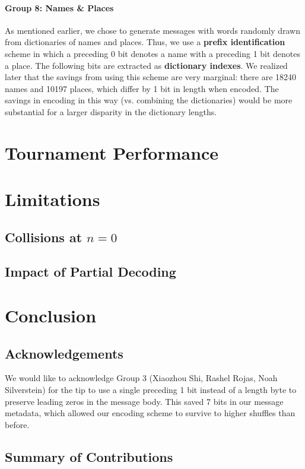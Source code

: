 \documentclass{article}
\begin{document}
\paragraph{Group 8: Names \& Places} As mentioned earlier, we chose to generate messages with words randomly drawn from dictionaries of names and places. Thus, we use a \textbf{prefix identification} scheme in which a preceding 0 bit denotes a name with a preceding 1 bit denotes a place. The following bits are extracted as \textbf{dictionary indexes}. We realized later that the savings from using this scheme are very marginal: there are 18240 names and 10197 places, which differ by 1 bit in length when encoded. The savings in encoding in this way (vs. combining the dictionaries) would be more substantial for a larger disparity in the dictionary lengths.

\section{Tournament Performance}

\section{Limitations}

\subsection{Collisions at $n=0$}

\subsection{Impact of Partial Decoding}

\section{Conclusion}

\subsection{Acknowledgements}
We would like to acknowledge Group 3 (Xiaozhou Shi, Rashel Rojas, Noah Silverstein) for the tip to use a single preceding 1 bit instead of a length byte to preserve leading zeros in the message body. This saved 7 bits in our message metadata, which allowed our encoding scheme to survive to higher shuffles than before.

\subsection{Summary of Contributions}


    
\end{document}

